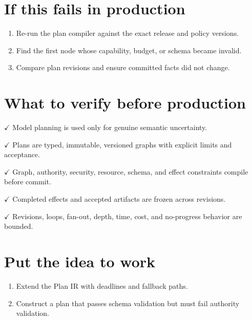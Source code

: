 \section{If this fails in production}

\begin{enumerate}

\item Re-run the plan compiler against the exact release and policy versions.

\item Find the first node whose capability, budget, or schema became invalid.

\item Compare plan revisions and ensure committed facts did not change.

\end{enumerate}

\section{What to verify before production}

\textbf{\ensuremath{\checkmark}} Model planning is used only for genuine semantic uncertainty.\par

\textbf{\ensuremath{\checkmark}} Plans are typed, immutable, versioned graphs with explicit limits and acceptance.\par

\textbf{\ensuremath{\checkmark}} Graph, authority, security, resource, schema, and effect constraints compile before commit.\par

\textbf{\ensuremath{\checkmark}} Completed effects and accepted artifacts are frozen across revisions.\par

\textbf{\ensuremath{\checkmark}} Revisions, loops, fan-out, depth, time, cost, and no-progress behavior are bounded.\par

\section{Put the idea to work}

\begin{enumerate}

\item Extend the Plan IR with deadlines and fallback paths.

\item Construct a plan that passes schema validation but must fail authority validation.

\end{enumerate}

